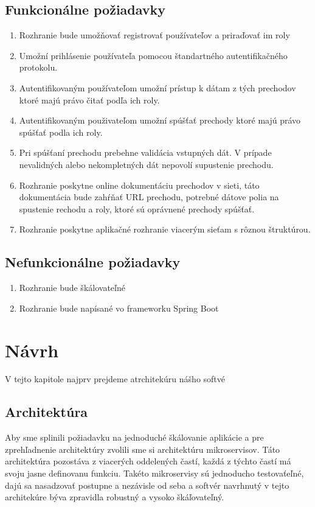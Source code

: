 \subsection{Funkcionálne požiadavky}
\begin{enumerate}
	\item Rozhranie bude umožňovať registrovať používateľov a priraďovať im roly
	\item Umožní prihlásenie používateľa pomocou štandartného autentifikačného protokolu.
	\item Autentifikovaným používateľom umožní prístup k dátam z tých prechodov ktoré majú právo čitať podľa ich roly.
	\item Autentifikovaným použivateľom umožní spúšťať prechody ktoré majú právo spúšťať podla ich roly.
	\item Pri spúšťaní prechodu prebehne validácia vstupných dát. V prípade nevalidných alebo nekompletných dát nepovolí supustenie prechodu.
	\item Rozhranie poskytne online dokumentáciu prechodov v sieti, táto dokumentácia bude zahŕňať URL prechodu, potrebné dátove polia na spustenie rechodu a roly, ktoré sú oprávnené prechody spúšťať.
	\item Rozhranie poskytne aplikačné rozhranie viacerým sieťam s rôznou štruktúrou.
\end{enumerate}	



\subsection{Nefunkcionálne požiadavky}
\begin{enumerate}
	\item Rozhranie bude škálovateľné
	\item Rozhranie bude napísané vo frameworku Spring Boot
\end{enumerate}

\section{Návrh}
\noindent V tejto kapitole najprv prejdeme atrchitekúru nášho softvé

\subsection{Architektúra}
\noindent Aby sme splinili požiadavku na jednoduché škálovanie aplikácie a pre zprehľadnenie architektúry zvolili sme si architektúru mikroservisov. Táto architektúra pozostáva z viacerých oddelených častí, každá z týchto častí má svoju jasne definovanu funkciu. Takéto mikroservisy sú jednoducho testovaťeľné, dajú sa nasadzovať postupne a nezávisle od seba a softvér navrhnutý v tejto architekúre býva zpravidla robustný a vysoko škáľovateľný. 

